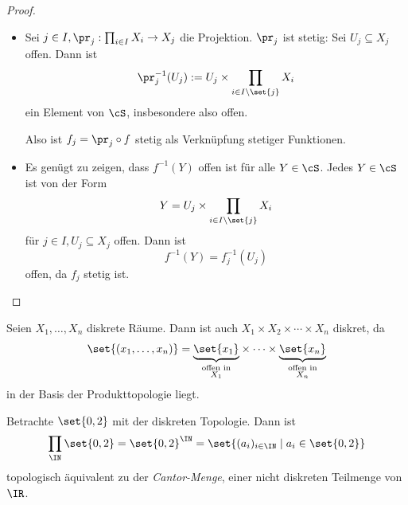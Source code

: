 \documentclass[language=ngerman]{TemplateLecture} %
\begin{document}
\begin{proof}\leavevmode
    \begin{itemize}
        \item[\enquote{$\Rightarrow$}:] Sei $j \in I, \pr_j: \prod_{i \in I} X_i \to X_j$ die Projektion. $\pr_j$ ist stetig: Sei $U_j \subseteq X_j$ offen. Dann ist 
        \begin{equation*}
            \pr_j^{-1}(U_j) := U_j \times \prod_{i \in I \setminus \set{j}} X_i
        \end{equation*}
        ein Element von $\cS$, insbesondere also offen.

        Also ist $f_j = \pr_j \circ f$ stetig als Verknüpfung stetiger Funktionen.

        \item[\enquote{$\Leftarrow$}:] Es genügt zu zeigen, dass $f^{-1}(Y)$ offen ist für alle $Y \in \cS$. Jedes $Y \in \cS$ ist von der Form
        \begin{equation*}
            Y = U_j \times \prod_{i \in I \setminus \set{j}} X_i
        \end{equation*}
        für $j \in I, U_j \subseteq X_j$ offen. Dann ist 
        \begin{equation*}
            f^{-1}(Y) = f_j^{-1}(U_j)
        \end{equation*}
        offen, da $f_j$ stetig ist.
    \end{itemize}
\end{proof}

\begin{example}
    Seien $X_1, \ldots, X_n$ diskrete Räume. Dann ist auch $X_1 \times X_2 \times \cdots \times X_n$ diskret, da 
    \begin{equation*}
        \set{(x_1,\ldots,x_n)} = \underset{\substack{\text{offen in}\\ X_1}}{\underbrace{\set{x_1}}} \times \cdots \times \underset{\substack{\text{offen in}\\ X_n}}{\underbrace{\set{x_n}}}
    \end{equation*}
    in der Basis der Produkttopologie liegt.
\end{example}

\begin{example}
    Betrachte $\set{0,2}$ mit der diskreten Topologie. Dann ist 
    \begin{equation*}
        \prod_\IN \set{0,2} = \set{0,2}^\IN = \set{(a_i)_{i \in \IN} \mid a_i \in \set{0,2}}
    \end{equation*}
    topologisch äquivalent zu der \emph{Cantor-Menge}, einer nicht diskreten Teilmenge von $\IR$.
\end{example}
\end{document}
